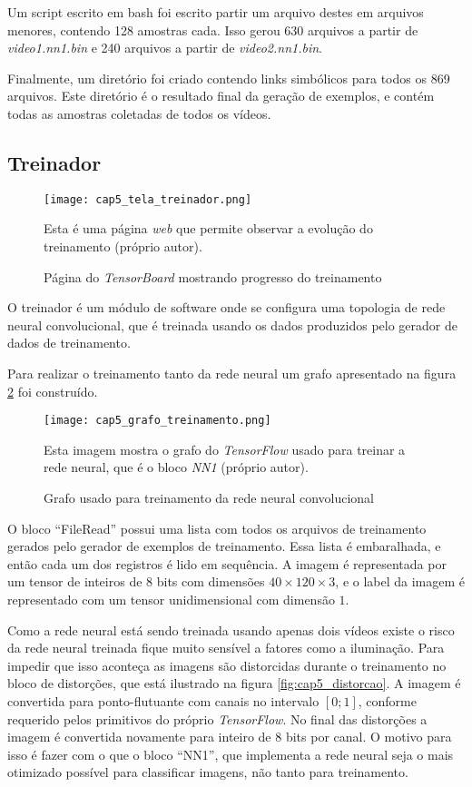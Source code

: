 Um script escrito em bash foi escrito partir um arquivo destes em arquivos
menores, contendo 128 amostras cada. Isso gerou 630 arquivos a partir de
\emph{video1.nn1.bin} e 240 arquivos a partir de \emph{video2.nn1.bin}.

Finalmente, um diretório foi criado contendo links simbólicos para todos os 869
arquivos. Este diretório é o resultado final da geração de exemplos, e contém
todas as amostras coletadas de todos os vídeos.

\subsection{Treinador}

\begin{figure}[!htb]
	\centering
	\texttt{[image: cap5\_tela\_treinador.png]}
	\caption{Página do \emph{TensorBoard} mostrando progresso do treinamento}
	\label{fig:cap5_tela_treinador}
	Esta é uma página \emph{web} que permite observar a evolução do
	treinamento (próprio autor).
\end{figure}

O treinador é um módulo de software onde se configura uma topologia de rede
neural convolucional, que é treinada usando os dados produzidos pelo gerador de
dados de treinamento.

Para realizar o treinamento tanto da rede neural um grafo apresentado na figura
\ref{fig:cap5_grafo_treinamento} foi construído.

\begin{figure}[!htb]
	\centering
	\texttt{[image: cap5\_grafo\_treinamento.png]}
	\caption{Grafo usado para treinamento da rede neural convolucional}
	\label{fig:cap5_grafo_treinamento}
	Esta imagem mostra o grafo do \emph{TensorFlow} usado para treinar
	a rede neural, que é o bloco \emph{NN1} (próprio autor).
\end{figure}

O bloco “FileRead” possui uma lista com todos os arquivos de treinamento
gerados pelo gerador de exemplos de treinamento. Essa lista é embaralhada, e
então cada um dos registros é lido em sequência. A imagem é representada por um
tensor de inteiros de 8 bits com dimensões $40 \times 120 \times 3$, e o
label da imagem é representado com um tensor unidimensional com dimensão $1$.

Como a rede neural está sendo treinada usando apenas dois vídeos existe o risco
da rede neural treinada fique muito sensível a fatores como a iluminação. Para
impedir que isso aconteça as imagens são distorcidas durante o treinamento no
bloco de distorções, que está ilustrado na figura \ref{fig:cap5_distorcao}.
A imagem é convertida para ponto-flutuante com canais no intervalo $[0;1]$,
conforme requerido pelos primitivos do próprio \emph{TensorFlow}.
No final das distorções a imagem é convertida
novamente para inteiro de 8 bits por canal. O motivo para isso é fazer com o
que o bloco “NN1”, que implementa a rede neural seja o mais otimizado possível
para classificar imagens, não tanto para treinamento.

